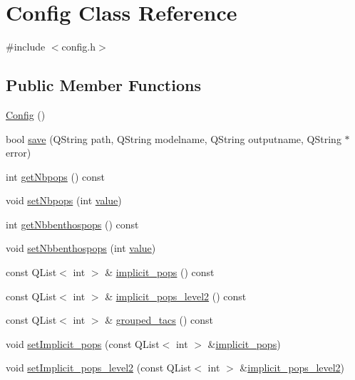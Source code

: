 \hypertarget{class_config}{}\section{Config Class Reference}
\label{class_config}


{\ttfamily \#include $<$config.\+h$>$}

\subsection*{Public Member Functions}
\begin{DoxyCompactItemize}
\item 
\mbox{\hyperlink{class_config_abd0c571c116924871e30444b192b792a}{Config}} ()
\item 
bool \mbox{\hyperlink{class_config_a74d4ba7919c0cc3eddb22d836861344a}{save}} (Q\+String path, Q\+String modelname, Q\+String outputname, Q\+String $\ast$error)
\item 
int \mbox{\hyperlink{class_config_ab202e96cdfea3ca5a6ef3025219c502c}{get\+Nbpops}} () const
\item 
void \mbox{\hyperlink{class_config_af0071bb155f7a9491a2c47383d827adf}{set\+Nbpops}} (int \mbox{\hyperlink{diffusion_8cpp_a4b41795815d9f3d03abfc739e666d5da}{value}})
\item 
int \mbox{\hyperlink{class_config_a195f6e3a5e3a3e35a41716ec53fa0365}{get\+Nbbenthospops}} () const
\item 
void \mbox{\hyperlink{class_config_acd0bf6785354a69b37af0684e3d7bd8c}{set\+Nbbenthospops}} (int \mbox{\hyperlink{diffusion_8cpp_a4b41795815d9f3d03abfc739e666d5da}{value}})
\item 
const Q\+List$<$ int $>$ \& \mbox{\hyperlink{class_config_a8f3b135cd618bfec4f380e04bef5f787}{implicit\+\_\+pops}} () const
\item 
const Q\+List$<$ int $>$ \& \mbox{\hyperlink{class_config_a1de9a380a6c5a19fa2973cd1e786ba45}{implicit\+\_\+pops\+\_\+level2}} () const
\item 
const Q\+List$<$ int $>$ \& \mbox{\hyperlink{class_config_a6627eb314eacce2817c04811826a3a65}{grouped\+\_\+tacs}} () const
\item 
void \mbox{\hyperlink{class_config_aa8cb20d3adf8c13107a32f8add00e575}{set\+Implicit\+\_\+pops}} (const Q\+List$<$ int $>$ \&\mbox{\hyperlink{class_config_a8f3b135cd618bfec4f380e04bef5f787}{implicit\+\_\+pops}})
\item 
void \mbox{\hyperlink{class_config_add968c3863cec6bc9c09266caefd2e5d}{set\+Implicit\+\_\+pops\+\_\+level2}} (const Q\+List$<$ int $>$ \&\mbox{\hyperlink{class_config_a1de9a380a6c5a19fa2973cd1e786ba45}{implicit\+\_\+pops\+\_\+level2}})

\end{DoxyCompactItemize}
